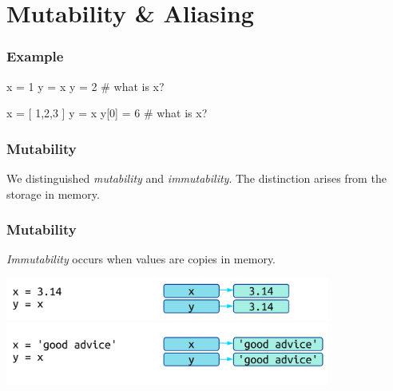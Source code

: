 \documentclass[11pt]{beamer}
\begin{document}
\section{Mutability \& Aliasing}

\begin{frame}[fragile]
  \frametitle{Example}
  \Enlarge

  \begin{semiverbatim}
x = 1
y = x
y = 2
# what is x? %

x = [ 1,2,3 ]
y = x
y[0] = 6
# what is x?
  \end{semiverbatim}
\end{frame}

\begin{frame}[fragile]
  \frametitle{Mutability}
  \Enlarge

  \begin{itemize}
  \myitem  We distinguished \emph{mutability} and \emph{immutability}. %
  \myitem  The distinction arises from the storage in memory.
  \end{itemize}
\end{frame}

\begin{frame}[fragile]
  \frametitle{Mutability}
  \Enlarge

  \begin{itemize}
  \myitem  \emph{Immutability} occurs when values are copies in memory.
  \end{itemize}
  \includegraphics[width=0.8\textwidth]{./img/memory-immutability.png} \\
  \includegraphics[width=0.8\textwidth]{./img/memory-immutability-string.png}
\end{frame}
\end{document}
